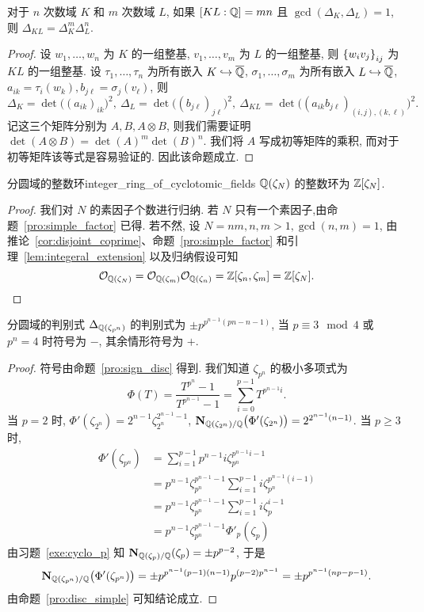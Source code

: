 \begin{corollary}{}{}
对于 $n$ 次数域 $K$ 和 $m$ 次数域 $L$, 如果 $[KL:{\mathbb{Q}}]=mn$ 且 $\gcd(\Delta_K,\Delta_L)=1$, 则 $\Delta_{KL}=\Delta_K^m\Delta_L^n$.
\end{corollary}
\begin{proof}
设 $w_1,\dots,w_n$ 为 $K$ 的一组整基, $v_1,\dots,v_m$ 为 $L$ 的一组整基, 则 $\left\{w_iv_j\right\}_{ij}$ 为 $KL$ 的一组整基. 设 $\tau_1,\dots,\tau_n$ 为所有嵌入 $K\hookrightarrow\overline{{\mathbb{Q}}}$, $\sigma_1,\dots,\sigma_m$ 为所有嵌入 $L\hookrightarrow\overline{{\mathbb{Q}}}$, $a_{ik}=\tau_i(w_k),b_{j\ell}=\sigma_j(v_\ell)$, 则
	\[\Delta_K=\det\bigl((a_{ik})_{ik}\bigr)^2,\ 
		\Delta_L=\det\bigl((b_{j\ell})_{j\ell}\bigr)^2,\ 
		\Delta_{KL}=\det\bigl((a_{ik}b_{j\ell})_{(i,j),(k,\ell)}\bigr)^2.\]
记这三个矩阵分别为 $A,B,A\otimes B$, 则我们需要证明 $\det(A\otimes B)=\det(A)^m\det(B)^n$. 我们将 $A$ 写成初等矩阵的乘积, 而对于初等矩阵该等式是容易验证的. 因此该命题成立.
\end{proof}



\begin{theorem}{分圆域的整数环}{integer_ring_of_cyclotomic_fields}
${\mathbb{Q}}(\zeta_N)$ 的整数环为 ${\mathbb{Z}}[\zeta_N]$.
\end{theorem}
\begin{proof}
我们对 $N$ 的素因子个数进行归纳. 若 $N$ 只有一个素因子,由命题~\ref{pro:simple_factor} 已得. 若不然, 设 $N=nm,n,m>1,\gcd(n,m)=1$, 由推论~\ref{cor:disjoint_coprime}、命题~\ref{pro:simple_factor} 和引理~\ref{lem:integeral_extension} 以及归纳假设可知
\[{\mathcal{O}}_{{\mathbb{Q}}(\zeta_N)}={\mathcal{O}}_{{\mathbb{Q}}(\zeta_m)}{\mathcal{O}}_{{\mathbb{Q}}(\zeta_n)}={\mathbb{Z}}[\zeta_n,\zeta_m]={\mathbb{Z}}[\zeta_N].\]
\end{proof}

\begin{proposition}{分圆域的判别式}{}
$\Delta_{{\mathbb{Q}}(\zeta_{p^n})}$ 的判别式为 $\pm p^{p^{n-1}(pn-n-1)}$, 当 $p\equiv 3\mod 4$ 或 $p^n=4$ 时符号为 $-$, 其余情形符号为 $+$.
\end{proposition}
\begin{proof}
符号由命题~\ref{pro:sign_disc} 得到. 我们知道 $\zeta_{p^n}$ 的极小多项式为
  \[\Phi(T)=\frac{T^{p^n}-1}{T^{p^{n-1}}-1}=\sum_{i=0}^{p-1} T^{p^{n-1}i}.\]
当 $p=2$ 时, $\Phi'(\zeta_{2^n})=2^{n-1}\zeta_{2^n}^{2^{n-1}-1}$, ${\mathbf{N}}_{{\mathbb{Q}}(\zeta_{2^n})/{\mathbb{Q}}}\bigl(\Phi'(\zeta_{2^n})\bigr)=2^{2^{n-1}(n-1)}$. 当 $p\ge 3$ 时, 
  \[\begin{split}
    \Phi'(\zeta_{p^n})&=\sum_{i=1}^{p-1}p^{n-1}i\zeta_{p^n}^{p^{n-1}i-1}\\
     &=p^{n-1}\zeta_{p^n}^{p^{n-1}-1}\sum_{i=1}^{p-1}i\zeta_{p^n}^{p^{n-1}(i-1)}\\
     &=p^{n-1}\zeta_{p^n}^{p^{n-1}-1}\sum_{i=1}^{p-1}i\zeta_{p}^{i-1}\\
     &=p^{n-1}\zeta_{p^n}^{p^{n-1}-1}\Phi'_p(\zeta_p)
  \end{split}\]
由习题~\ref{exe:cyclo_p} 知 ${\mathbf{N}}_{{\mathbb{Q}}(\zeta_p)/{\mathbb{Q}}}(\zeta_p)=\pm p^{p-2}$, 于是
  \[{\mathbf{N}}_{{\mathbb{Q}}(\zeta_{p^n})/{\mathbb{Q}}}\bigl(\Phi'(\zeta_{p^n})\bigr)=\pm p^{p^{n-1}(p-1)(n-1)} p^{(p-2)p^{n-1}}=\pm p^{p^{n-1}(np-p-1)}.\]
由命题~\ref{pro:disc_simple} 可知结论成立.
\end{proof}

